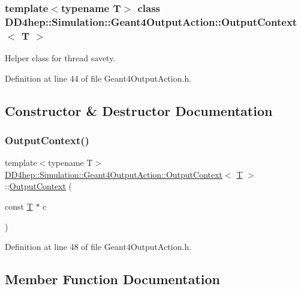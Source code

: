 \subsubsection*{template$<$typename T$>$\newline
class D\+D4hep\+::\+Simulation\+::\+Geant4\+Output\+Action\+::\+Output\+Context$<$ T $>$}

Helper class for thread savety. 

Definition at line 44 of file Geant4\+Output\+Action.\+h.



\subsection{Constructor \& Destructor Documentation}
\hypertarget{class_d_d4hep_1_1_simulation_1_1_geant4_output_action_1_1_output_context_a17ae6b51c22363bc840aaa02ea106c9f}{}\label{class_d_d4hep_1_1_simulation_1_1_geant4_output_action_1_1_output_context_a17ae6b51c22363bc840aaa02ea106c9f} 
\subsubsection{\texorpdfstring{Output\+Context()}{OutputContext()}}
{\footnotesize\ttfamily template$<$typename T$>$ \\
\hyperlink{class_d_d4hep_1_1_simulation_1_1_geant4_output_action_1_1_output_context}{D\+D4hep\+::\+Simulation\+::\+Geant4\+Output\+Action\+::\+Output\+Context}$<$ \hyperlink{class_t}{T} $>$\+::\hyperlink{class_d_d4hep_1_1_simulation_1_1_geant4_output_action_1_1_output_context}{Output\+Context} (\begin{DoxyParamCaption}\item[{const \hyperlink{class_t}{T} $\ast$}]{c }\end{DoxyParamCaption})\hspace{0.3cm}{\ttfamily [inline]}}



Definition at line 48 of file Geant4\+Output\+Action.\+h.



\subsection{Member Function Documentation}
\hypertarget{class_d_d4hep_1_1_simulation_1_1_geant4_output_action_1_1_output_context_a402a8c4a5cb1a9320dd0596bff3c7445}{}\label{class_d_d4hep_1_1_simulation_1_1_geant4_output_action_1_1_output_context_a402a8c4a5cb1a9320dd0596bff3c7445} 
